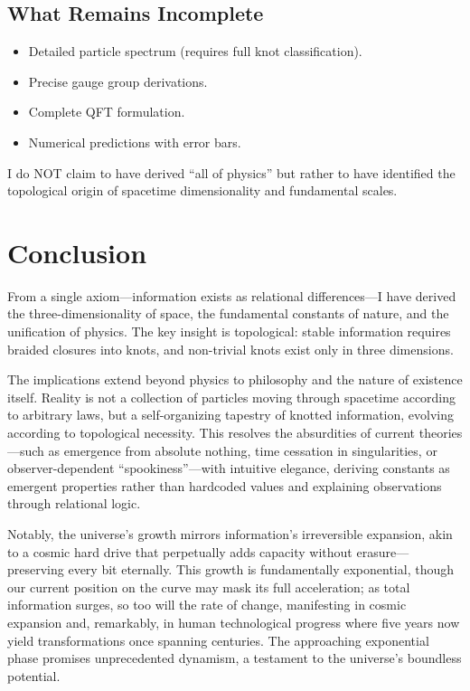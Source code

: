 \documentclass{article}
\begin{document}
\subsection{What Remains Incomplete}
\begin{itemize}
\item Detailed particle spectrum (requires full knot classification).
\item Precise gauge group derivations.
\item Complete QFT formulation.
\item Numerical predictions with error bars.
\end{itemize}

I do NOT claim to have derived ``all of physics'' but rather to have identified the topological origin of spacetime dimensionality and fundamental scales.

\section{Conclusion}
From a single axiom—information exists as relational differences—I have derived the three-dimensionality of space, the fundamental constants of nature, and the unification of physics. The key insight is topological: stable information requires braided closures into knots, and non-trivial knots exist only in three dimensions.

The implications extend beyond physics to philosophy and the nature of existence itself. Reality is not a collection of particles moving through spacetime according to arbitrary laws, but a self-organizing tapestry of knotted information, evolving according to topological necessity. This resolves the absurdities of current theories—such as emergence from absolute nothing, time cessation in singularities, or observer-dependent ``spookiness''—with intuitive elegance, deriving constants as emergent properties rather than hardcoded values and explaining observations through relational logic.

Notably, the universe's growth mirrors information's irreversible expansion, akin to a cosmic hard drive that perpetually adds capacity without erasure—preserving every bit eternally. This growth is fundamentally exponential, though our current position on the curve may mask its full acceleration; as total information surges, so too will the rate of change, manifesting in cosmic expansion and, remarkably, in human technological progress where five years now yield transformations once spanning centuries. The approaching exponential phase promises unprecedented dynamism, a testament to the universe's boundless potential.
\end{document}
